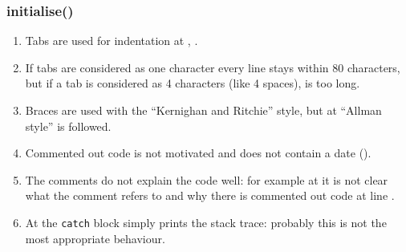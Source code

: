 \subsubsection{initialise()}
\begin{enumerate}
    \item {} Tabs are used for indentation at , .
    \item {} If tabs are considered as one character every line stays within 80 characters, but if a tab is considered as 4 characters (like 4 spaces),  is too long.
    \item {} Braces are used with the ``Kernighan and Ritchie'' style, but at  ``Allman style'' is followed.
    \item {} Commented out code is not motivated and does not contain a date ().
    \item {} The comments do not explain the code well: for example at  it is not clear what the comment refers to and why there is commented out code at line .
    \item {} At  the \texttt{catch} block simply prints the stack trace: probably this is not the most appropriate behaviour.
\end{enumerate}
